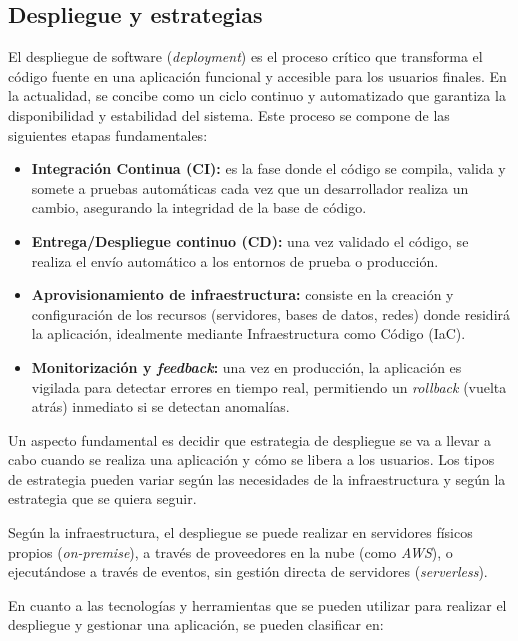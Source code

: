 \subsection{Despliegue y estrategias}

El despliegue de software (\textit{deployment}) es el proceso crítico que transforma el código fuente en una aplicación funcional 
y accesible para los usuarios finales. En la actualidad, se concibe como un ciclo continuo y automatizado que garantiza 
la disponibilidad y estabilidad del sistema. Este proceso se compone de las siguientes etapas fundamentales:

\begin{itemize}
    \item \textbf{Integración Continua (CI):} es la fase donde el código se compila, valida y somete a pruebas automáticas cada 
    vez que un desarrollador realiza un cambio, asegurando la integridad de la base de código.
    \item \textbf{Entrega/Despliegue continuo (CD):} una vez validado el código, se realiza el envío automático a los entornos 
    de prueba o producción.
    \item \textbf{Aprovisionamiento de infraestructura:} consiste en la creación y configuración de los recursos (servidores, 
    bases de datos, redes) donde residirá la aplicación, idealmente mediante Infraestructura como Código (IaC).
    \item \textbf{Monitorización y \textit{feedback}:} una vez en producción, la aplicación es vigilada para detectar errores en 
    tiempo real, permitiendo un \textit{rollback} (vuelta atrás) inmediato si se detectan anomalías.
\end{itemize}

Un aspecto fundamental es decidir que estrategia de despliegue se va a llevar a cabo cuando se realiza una aplicación 
y cómo se libera a los usuarios. Los tipos de estrategia pueden variar según las necesidades de la infraestructura y 
según la estrategia que se quiera seguir. 

Según la infraestructura, el despliegue se puede realizar en servidores físicos propios (\textit{on-premise}), a través 
de proveedores en la nube (como \textit{AWS}), o ejecutándose a través de eventos, sin gestión directa de servidores 
(\textit{serverless}).

En cuanto a las tecnologías y herramientas que se pueden utilizar para realizar el despliegue y gestionar una aplicación,
se pueden clasificar en:

